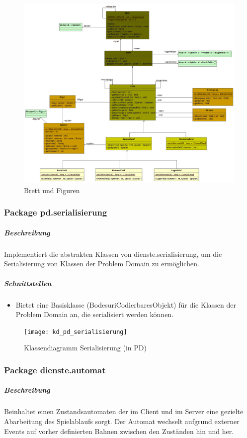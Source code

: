 \documentclass[12pt,halfparskip]{scrartcl}
\begin{document}
\label{ssub:diagramme}
\begin{figure}[h]
	\centering
	\includegraphics[width=\textwidth]{pd_brett}
	\caption{Brett und Figuren}
	\label{fig:pd_brett}
\end{figure}


\clearpage
\subsubsection{Package pd.serialisierung}

\subparagraph{Beschreibung}
Implementiert die abstrakten Klassen von dienste.serialisierung, um die Serialisierung von Klassen der Problem Domain zu ermöglichen.

\subparagraph{Schnittstellen}
\begin{itemize}
	\item Bietet eine Basisklasse (BodesuriCodierbaresObjekt) für die Klassen der Problem Domain an, die serialisiert werden können.
\end{itemize}

\begin{figure}[h]
	\centering
	\texttt{[image: kd\_pd\_serialisierung]}
	\caption{Klassendiagramm Serialisierung (in PD)}
	\label{fig:kd_pd_serialisierung}
\end{figure}

\clearpage
\subsubsection{Package dienste.automat} %
\label{ssub:package_dienste}
\subparagraph{Beschreibung}
Beinhaltet einen Zustandsautomaten der im Client und im Server eine gezielte Abarbeitung
des Spielablaufs sorgt. Der Automat wechselt aufgrund externer Events auf vorher definierten
Bahnen zwischen den Zuständen hin und her.
\end{document}
